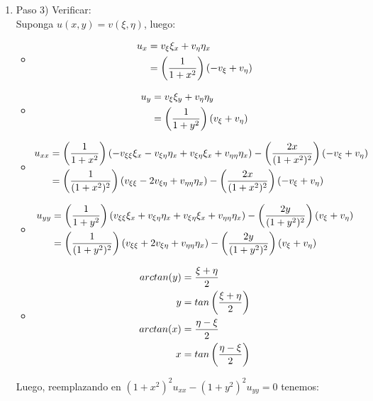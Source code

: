 \begin{homeworkProblem}
\begin{enumerate}[(i)]
\begin{solucion}
\begin{enumerate}
        \item Paso 3) Verificar:\\
        Suponga $u(x,y)=v(\xi,\eta)$, luego:
        \begin{itemize}
            \item \begin{align*}
                u_{x}&=v_{\xi}\xi_{x}+v_{\eta}\eta_{x}\\
                &=\left( \frac{1}{1+x^2} \right)(-v_{\xi}+v_{\eta})
            \end{align*}
            \item \begin{align*}
                u_{y}&=v_{\xi}\xi_{y}+v_{\eta}\eta_{y}\\
                &=\left( \frac{1}{1+y^2} \right)(v_{\xi}+v_{\eta})            \end{align*}
            \item \begin{align*}
                u_{xx}&=\left( \frac{1}{1+x^2} \right)(-v_{\xi\xi}\xi_{x}-v_{\xi\eta}\eta_{x}+v_{\xi\eta}\xi_{x}+v_{\eta\eta}\eta_{x})-\left( \frac{2x}{(1+x^2)^2} \right)(-v_{\xi}+v_{\eta})\\
                &=\left( \frac{1}{(1+x^2)^2} \right)(v_{\xi\xi}-2v_{\xi\eta}+v_{\eta\eta}\eta_{x})-\left( \frac{2x}{(1+x^2)^2} \right)(-v_{\xi}+v_{\eta})
            \end{align*}
            \item \begin{align*}
                u_{yy}&=\left( \frac{1}{1+y^2} \right)(v_{\xi\xi}\xi_{x}+v_{\xi\eta}\eta_{x}+v_{\xi\eta}\xi_{x}+v_{\eta\eta}\eta_{x})-\left( \frac{2y}{(1+y^2)^2} \right)(v_{\xi}+v_{\eta})\\
                &=\left( \frac{1}{(1+y^2)^2} \right)(v_{\xi\xi}+2v_{\xi\eta}+v_{\eta\eta}\eta_{x})-\left( \frac{2y}{(1+y^2)^2} \right)(v_{\xi}+v_{\eta})
            \end{align*}
            \item \begin{align*}
                arctan(y)&=\frac{\xi+\eta}{2}\\
                y&=tan\left( \frac{\xi+\eta}{2} \right)\\
                arctan(x)&=\frac{\eta-\xi}{2}\\
                x&=tan\left( \frac{\eta-\xi}{2} \right)
                \end{align*}
        \end{itemize}
        Luego, reemplazando en $(1+x^{2})^{2}u_{xx}-(1+y^2)^2u_{yy}=0$ tenemos:

\end{enumerate}
\end{solucion}
\end{enumerate}
\end{homeworkProblem}
